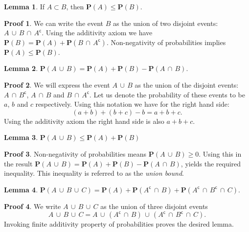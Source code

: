 \documentclass[11pt]{amsart}
\theoremstyle{definition} \newtheorem{thm}{Theorem} \theoremstyle{plain}
\theoremstyle{definition} \newtheorem*{nnthm}{Theorem} \theoremstyle{plain}
\theoremstyle{definition} \newtheorem{lem}{Lemma} \theoremstyle{plain}
\theoremstyle{definition} \newtheorem*{nnlem}{Lemma} \theoremstyle{plain}
\theoremstyle{definition} \newtheorem{prf}{Proof} \theoremstyle{plain}
\theoremstyle{definition} \newtheorem*{nnprf}{Proof} \theoremstyle{plain}
\theoremstyle{definition} \newtheorem{eg}{Example} \theoremstyle{plain}
\theoremstyle{definition} \newtheorem*{sol}{Solution} \theoremstyle{plain}
\newcommand{\setcomp}[1]{{#1}^{\mathsf{c}}}
\newcommand{\prob}[1]{\mathbf{P}(#1)}
\newcommand{\twocup}[2]{{#1} \,\cup\, {#2}}
\newcommand{\threecup}[3]{{#1} \,\cup\, {#2} \,\cup\, {#3}}
\newcommand{\twocap}[2]{{#1} \,\cap\, {#2}}
\newcommand{\threecap}[3]{{#1} \,\cap\, {#2} \,\cap\, {#3}}
\begin{document}
\begin{lem}
If $A \subset B$, then $\prob{A} \leq \prob{B}$.
\end{lem}
\begin{nnprf}
We can write the event $B$ as the union of two disjoint events: 
$\twocup{A}{\twocap{B}{\setcomp{A}}}$. Using the additivity axiom we have
$\prob{B} = \prob{A} + \prob{\twocap{B}{\setcomp{A}}}$. Non-negativity of 
probabilities implies $\prob{A} \leq \prob{B}$. 
\end{nnprf}

\begin{lem}
$\prob{\twocup{A}{B}} = \prob{A} + \prob{B} - \prob{\twocap{A}{B}}$.
\end{lem}
\begin{nnprf}
We will express the event $\twocup{A}{B}$ as the union of the disjoint events: 
$\twocap{A}{\setcomp{B}}$, $\twocap{A}{B}$ and $\twocap{B}{\setcomp{A}}$. Let 
us denote the probability of these events to be $a$, $b$ and $c$ respectively. 
Using this notation we have for the right hand side:
\begin{equation*}
(a + b) + (b + c) - b = a + b + c.
\end{equation*}
Using the additivity axiom the right hand side is also $a + b + c$. 
\end{nnprf}

\begin{lem}
$\prob{\twocup{A}{B}} \leq \prob{A} + \prob{B}$
\end{lem}
\begin{nnprf}
Non-negativity of probabilities means $\prob{\twocup{A}{B}} \geq 0$. Using this 
in the result 
$\prob{\twocup{A}{B}} = \prob{A} + \prob{B} - \prob{\twocap{A}{B}}$, yields the 
required inequality. This inequality is referred to as the \emph{union bound}.
\end{nnprf}

\begin{lem}
$
\prob{\threecup{A}{B}{C}} = \prob{A} + \prob{\twocap{\setcomp{A}}{B}} + 
\prob{\threecap{\setcomp{A}}{\setcomp{B}}{C}}$.
\end{lem}
\begin{nnprf}
We write $\threecup{A}{B}{C}$ as the union of three disjoint events 
\begin{equation*}
\threecup{A}{B}{C} = 
\threecup{A}{(\twocap{\setcomp{A}}{B})}{(\threecap{\setcomp{A}}{\setcomp{B}}{C})}.
\end{equation*}
Invoking finite additivity property of probabilities proves the desired lemma. 
\end{nnprf}
\end{document}
